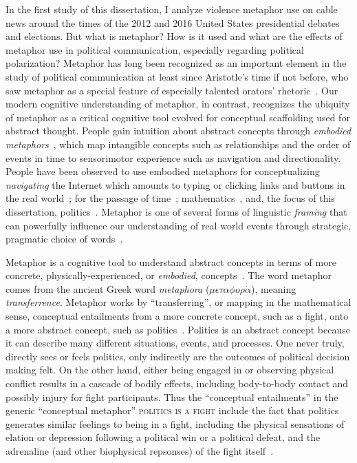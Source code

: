 \documentclass[12pt,letterpaper]{article}
\begin{document}
In the first study of this dissertation, I analyze violence metaphor use on
cable news around the times of the 2012 and 2016 United States presidential
debates and elections. But what is metaphor? How is it used and what are the
effects of metaphor use in political communication, especially regarding
political polarization? Metaphor has long been recognized as an important 
element in the study of political 
communication at least since Aristotle's time if not before, 
who saw metaphor as a special 
feature of especially talented orators' rhetoric~\cite{Aristotle1965,Kirby1997}. Our
modern cognitive understanding of metaphor, in contrast, recognizes the
ubiquity of metaphor as a critical cognitive tool evolved for 
conceptual scaffolding used for abstract thought.  
People gain intuition about abstract concepts through
\emph{embodied metaphors}~\cite{Gibbs2006,Gibbs2010}, which map intangible
concepts such as relationships and the order of events in time to sensorimotor
experience such as navigation and directionality. 
People have been observed to use embodied metaphors for conceptualizing
\emph{navigating} the Internet which amounts to typing or clicking links and buttons
in the real world~\cite{Matlock2014};
for the passage of time~\cite{Matlock2005,Nunez2012,Flusberg2017a}; 
mathematics~\cite{Lakoff1997,Marghetis2013}, 
and, the focus of this dissertation, politics~\cite{Lakoff2008,Charteris-Black2009}.
Metaphor is one of several forms of linguistic \emph{framing} that can 
powerfully influence our understanding of real world 
events through strategic, pragmatic choice of 
words~\cite{Fillmore1982,Chong2007,Fausey2011,Matlock2012,Sagi2013a,Cacciatore2016}.

Metaphor is a cognitive tool to understand abstract concepts in terms of more
concrete, physically-experienced, or \emph{embodied}, 
concepts~\cite{Lakoff1980,Gibbs2006,Gibbs2008,Gibbs2010}. The word metaphor
comes from the ancient Greek word \emph{metaphora} 
($\mu \epsilon \tau \alpha \phi o \rho \acute{\alpha}$), meaning
\emph{transferrence}. Metaphor works by ``transferring'', or mapping in
the mathematical sense, conceptual entailments
from a more concrete concept, such as a fight, onto a more abstract concept,
such as politics~\cite{Regier1996,Kovecses2010a,Lakoff2014}. 
Politics is an abstract concept because it can describe many
different situations, events, and processes. One never truly, directly sees or feels
politics, only indirectly are the outcomes of political decision making felt. 
On the other hand, either being engaged in or observing physical conflict
results in a cascade of bodily effects, including body-to-body contact and
possibly injury for fight participants. Thus the ``conceptual entailments'' in
the generic ``conceptual metaphor'' \textsc{politics is a fight} include the
fact that politics generates similar feelings to being in a fight, including
the physical sensations of elation or depression following a political win
or a political defeat, and the adrenaline (and other biophysical repsonses)
of the fight itself~\cite{Gallese2005,David2016}. 
\end{document}
